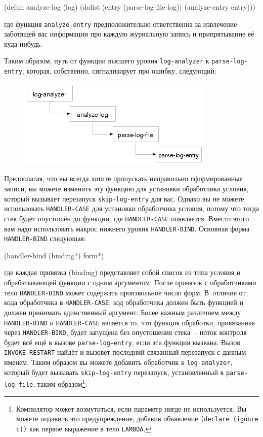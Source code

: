 \begin{myverb}
(defun analyze-log (log)
  (dolist (entry (parse-log-file log))
    (analyze-entry entry)))
\end{myverb}

\noindent{}где функция \lstinline{analyze-entry} предположительно ответственна за извлечение заботящей вас
информации про каждую журнальную запись и припрятывание её куда-нибудь.

Таким образом, путь от функции высшего уровня \lstinline{log-analyzer} к
\lstinline{parse-log-entry}, которая, собственно, сигнализирует про ошибку, следующий:

\begin{figure}[h]
  \centering
  \includegraphics[scale=0.6]{images/restart-call-stack.png}
\end{figure}

Предполагая, что вы всегда хотите пропускать неправильно сформированные записи, вы можете
изменить эту функцию для установки обработчика условия, который вызывает перезапуск
\lstinline{skip-log-entry} для вас. Однако вы не можете использовать \lstinline{HANDLER-CASE} для
установки обработчика условия, потому что тогда стек будет опустошён до функции, где
\lstinline{HANDLER-CASE} появляется. Вместо этого вам надо использовать макрос нижнего уровня
\lstinline{HANDLER-BIND}. Основная форма \lstinline{HANDLER-BIND} следующая:

\begin{myverb}
(handler-bind (binding*) form*)
\end{myverb}

\noindent{}где каждая привязка (binding) представляет собой список из типа условия и
обрабатывающей функции с одним аргументом. После провязок с обработчиками тело
\lstinline{HANDLER-BIND} может содержать произвольное число форм. В~отличие от кода
обработчика в \lstinline{HANDLER-CASE}, код обработчика должен быть функцией и должен
принимать единственный аргумент. Более важным различием между \lstinline{HANDLER-BIND} и
\lstinline{HANDLER-CASE} является то, что функция обработки, привязанная через
\lstinline{HANDLER-BIND}, будет запущена без опустошения стека~-- поток контроля будет всё
ещё в вызове \lstinline{parse-log-entry}, если эта функция вызвана. Вызов
\lstinline{INVOKE-RESTART} найдёт и вызовет последний связанный перезапуск с данным
именем. Таким образом вы можете добавить обработчик к \lstinline{log-analyzer}, который
будет вызывать \lstinline{skip-log-entry} перезапуск, установленный в
\lstinline{parse-log-file}, таким образом\footnote{Компилятор может возмутиться, если
  параметр нигде не используется. Вы можете подавить это предупреждение, добавив
  объявление \lstinline{(declare (ignore c))} как первое выражение в тело
\lstinline{LAMBDA}.}\hspace{\footnotenegspace}:

